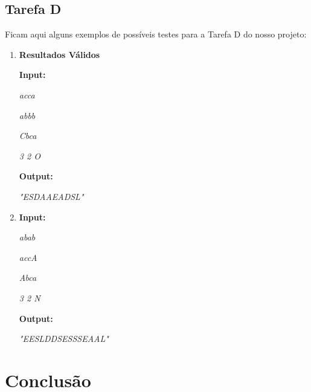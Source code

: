 \documentclass[a4paper, 12pt, portuguese]{article}
\begin{document}
\subsection{Tarefa D}

Ficam aqui alguns exemplos de possíveis testes para a Tarefa D do nosso projeto:

\begin{enumerate}

\vspace{1 mm}

\item\textbf{Resultados Válidos}

\textbf{Input:}

\vspace{2 mm}

\textit{acca}

\textit{abbb}

\textit{Cbca}

\textit{3 2 O}

\vspace{2 mm}

\textbf{Output:}

\vspace{2 mm}

\textit{"ESDAAEADSL"}

\vspace{2 mm}

\item

\textbf{Input:}

\vspace{2 mm}

\textit{abab}

\textit{accA}

\textit{Abca}

\textit{3 2 N}

\vspace{2 mm}

\textbf{Output:}

\vspace{2 mm}

\textit{"EESLDDSESSSEAAL"}

\vspace{2 mm}

\end{enumerate}


\section{Conclusão}
\end{document}
